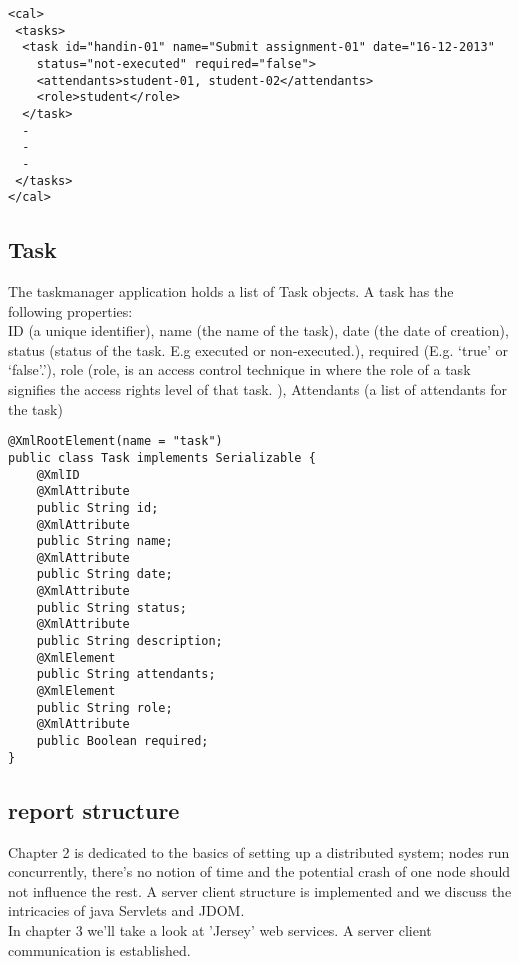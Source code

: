 \begin{lstlisting}[caption = taskmanager.xml]
<cal>
 <tasks>
  <task id="handin-01" name="Submit assignment-01" date="16-12-2013"
	status="not-executed" required="false">
	<attendants>student-01, student-02</attendants>
	<role>student</role>	
  </task>
  - 
  - 
  - 
 </tasks>
</cal>
\end{lstlisting}

\subsection{Task}
The taskmanager application holds a list of Task objects. A task has the following properties:\\

ID (a unique identifier), name (the name of the task), date (the date of creation), status (status of the task. E.g executed or non-executed.),
required (E.g. ‘true’ or ‘false’.’), role (role, is an access control technique in where the role of a task signifies the access rights level of that task. ), Attendants (a list of attendants for the task)\\


\begin{lstlisting}[caption=Task]
@XmlRootElement(name = "task")
public class Task implements Serializable {
    @XmlID
    @XmlAttribute
    public String id;
    @XmlAttribute
    public String name;
    @XmlAttribute
    public String date;
    @XmlAttribute
    public String status;
    @XmlAttribute
    public String description;
    @XmlElement
    public String attendants;
    @XmlElement
    public String role;
    @XmlAttribute
    public Boolean required;
}

\end{lstlisting}

\subsection{report structure}

Chapter 2 is dedicated to the basics of setting up a distributed system; nodes run concurrently, there’s no notion of time and the potential crash of one node should not influence the rest. A server client structure is implemented and we discuss the intricacies of java Servlets and JDOM. \\	

In chapter 3 we'll take a look at 'Jersey' web services. A server client communication is established. \\

